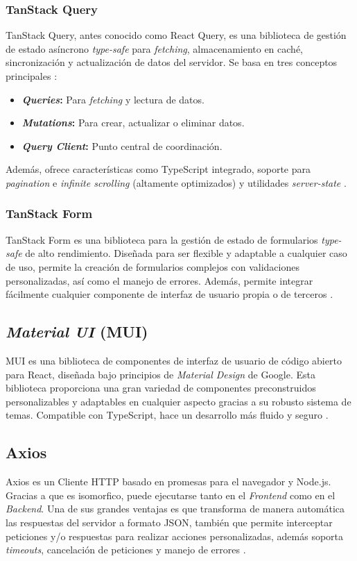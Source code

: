 \subsubsection{TanStack Query}
TanStack Query, antes conocido como React Query, es una biblioteca de gestión de estado asíncrono \textit{type-safe} para 
\textit{fetching}, almacenamiento en caché, sincronización y actualización de datos del servidor. Se basa en tres conceptos
principales \cite{garg2025react}:
\begin{itemize}
    \item \textbf{\textit{Queries}:} Para \textit{fetching} y lectura de datos.
    \item \textbf{\textit{Mutations}:} Para crear, actualizar o eliminar datos.
    \item \textbf{\textit{Query Client}:} Punto central de coordinación.
\end{itemize}
Además, ofrece características como TypeScript integrado, soporte para \textit{pagination} e \textit{infinite scrolling} 
(altamente optimizados) y utilidades \textit{server-state} \cite{garg2025react}.

\subsubsection{TanStack Form}
TanStack Form es una biblioteca para la gestión de estado de formularios \textit{type-safe} de alto rendimiento. Diseñada
para ser flexible y adaptable a cualquier caso de uso, permite la creación de formularios complejos con validaciones
personalizadas, así como el manejo de errores. Además, permite integrar fácilmente cualquier componente de interfaz de
usuario propia o de terceros \cite{tanstackSFform}.

\subsection{\textit{Material UI} (MUI)}
MUI es una biblioteca de componentes de interfaz de usuario de código abierto para React, diseñada bajo principios de
\textit{Material Design} de Google. Esta biblioteca proporciona una gran variedad de componentes preconstruidos
personalizables y adaptables en cualquier aspecto gracias a su robusto sistema de temas. Compatible con TypeScript,
hace un desarrollo más fluido y seguro \cite{mui2025materialUI}.

\subsection{Axios}
Axios es un Cliente HTTP basado en promesas para el navegador y Node.js. Gracias a que es \gls{isomorfico}, puede ejecutarse tanto
en el \textit{Frontend} como en el \textit{Backend}. Una de sus grandes ventajas es que transforma de manera automática las
respuestas del servidor a formato JSON, también que permite interceptar peticiones y/o respuestas para realizar acciones
personalizadas, además soporta \textit{timeouts}, cancelación de peticiones y manejo de errores \cite{axios2025axios}.

